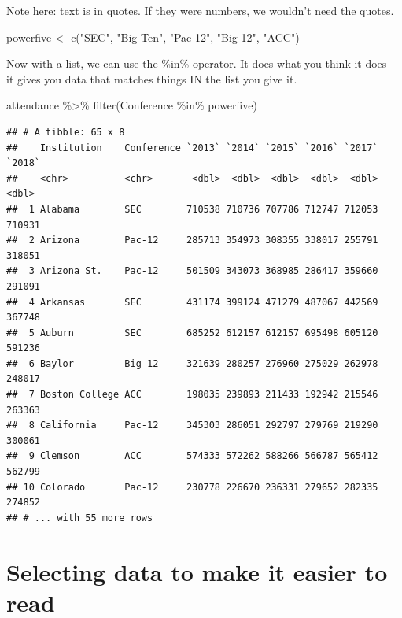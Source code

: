 \documentclass[
]{book}
\newenvironment{Shaded}{\begin{snugshade}}{\end{snugshade}}
\newcommand{\FunctionTok}[1]{\textcolor[rgb]{0.00,0.00,0.00}{#1}}
\newcommand{\NormalTok}[1]{#1}
\newcommand{\OtherTok}[1]{\textcolor[rgb]{0.56,0.35,0.01}{#1}}
\newcommand{\SpecialCharTok}[1]{\textcolor[rgb]{0.00,0.00,0.00}{#1}}
\newcommand{\StringTok}[1]{\textcolor[rgb]{0.31,0.60,0.02}{#1}}
\begin{document}
Note here: text is in quotes. If they were numbers, we wouldn't need the quotes.

\begin{Shaded}
\begin{Highlighting}[]
\NormalTok{powerfive }\OtherTok{\textless{}{-}} \FunctionTok{c}\NormalTok{(}\StringTok{"SEC"}\NormalTok{, }\StringTok{"Big Ten"}\NormalTok{, }\StringTok{"Pac{-}12"}\NormalTok{, }\StringTok{"Big 12"}\NormalTok{, }\StringTok{"ACC"}\NormalTok{)}
\end{Highlighting}
\end{Shaded}

Now with a list, we can use the \%in\% operator. It does what you think it does -- it gives you data that matches things IN the list you give it.

\begin{Shaded}
\begin{Highlighting}[]
\NormalTok{attendance }\SpecialCharTok{\%\textgreater{}\%} \FunctionTok{filter}\NormalTok{(Conference }\SpecialCharTok{\%in\%}\NormalTok{ powerfive)}
\end{Highlighting}
\end{Shaded}

\begin{verbatim}
## # A tibble: 65 x 8
##    Institution    Conference `2013` `2014` `2015` `2016` `2017` `2018`
##    <chr>          <chr>       <dbl>  <dbl>  <dbl>  <dbl>  <dbl>  <dbl>
##  1 Alabama        SEC        710538 710736 707786 712747 712053 710931
##  2 Arizona        Pac-12     285713 354973 308355 338017 255791 318051
##  3 Arizona St.    Pac-12     501509 343073 368985 286417 359660 291091
##  4 Arkansas       SEC        431174 399124 471279 487067 442569 367748
##  5 Auburn         SEC        685252 612157 612157 695498 605120 591236
##  6 Baylor         Big 12     321639 280257 276960 275029 262978 248017
##  7 Boston College ACC        198035 239893 211433 192942 215546 263363
##  8 California     Pac-12     345303 286051 292797 279769 219290 300061
##  9 Clemson        ACC        574333 572262 588266 566787 565412 562799
## 10 Colorado       Pac-12     230778 226670 236331 279652 282335 274852
## # ... with 55 more rows
\end{verbatim}

\hypertarget{selecting-data-to-make-it-easier-to-read}{%
\section{Selecting data to make it easier to read}\label{selecting-data-to-make-it-easier-to-read}}
\end{document}
